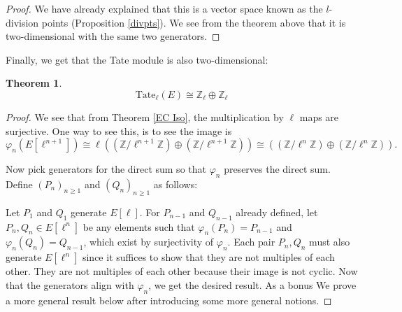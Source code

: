 \documentclass{article}
\newtheorem{thm}{Theorem}[section]
\theoremstyle{definition}
\theoremstyle{definition}
\theoremstyle{definition}
\newcommand{\tate}{\operatorname{Tate_{\ell}}}
\newcommand{\Z}{\mathbb{Z}}
\begin{document}
\begin{proof} We have already explained that this is a vector space known as the $l$-division points (Proposition \ref{divpts}). We see from the theorem above that it is two-dimensional with the same two generators.


\end{proof}

Finally, we get that the Tate module is also two-dimensional:

\begin{thm}
    $$\tate(E)\cong \Z_\ell\oplus\Z_\ell$$
\end{thm}
\begin{proof}
We see that from Theorem \ref{EC Iso}, the multiplication by $\ell$ maps are surjective. One way to see this, is to see the image is 
$$\varphi_n(E[\ell^{n+1}])\cong\ell((\Z/\ell^{n+1}\Z)\oplus(\Z/\ell^{n+1}\Z))\cong ((\Z/\ell^n\Z)\oplus(\Z/\ell^n\Z)).$$

Now pick generators for the direct sum so that $\varphi_n$ preserves the direct sum.
\newline\newline
Define $(P_n)_{n\geq1}$ and $(Q_n)_{n\geq1}$ as follows:

Let $P_1$ and $Q_1$ generate $E[\ell]$. For $P_{n-1}$ and $Q_{n-1}$ already defined, let $P_n,Q_n\in E[\ell^n]$ be any elements such that $\varphi_n(P_n)=P_{n-1}$ and $\varphi_n(Q_n)=Q_{n-1}$, which exist by surjectivity of $\varphi_n$. Each pair $P_n,Q_n$ must also generate $E[\ell^n]$ since it suffices to show that they are not multiples of each other. They are not multiples of each other because their image is not cyclic.
\newline\newline
Now that the generators align with $\varphi_n$, we get the desired result. As a bonus We prove a more general result below after introducing some more general notions.
\end{proof}
\end{document}
